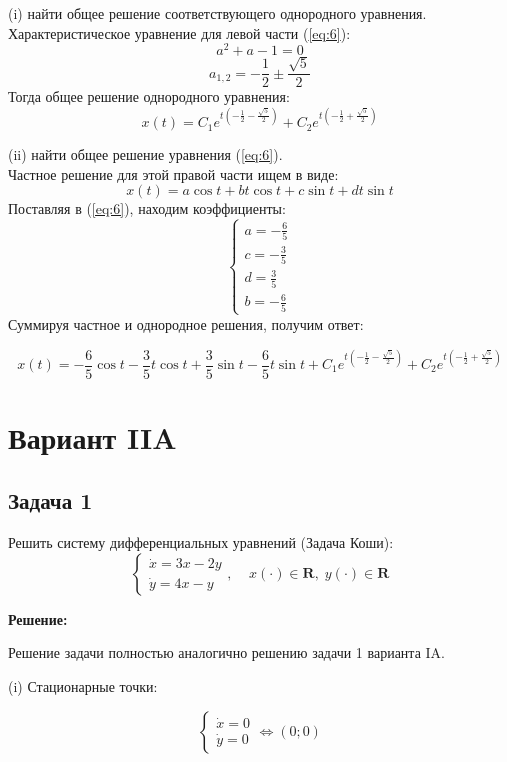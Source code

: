 \documentclass[a4paper, 12pt]{article}
\begin{document}
(i) найти общее решение соответствующего однородного уравнения.\\
Характеристическое уравнение для левой части (\ref{eq:6}):
\[a^2+a-1=0\]
\[a_{1,2}=-\frac 1 2 \pm \frac {\sqrt{5}}{2}\]
Тогда общее решение однородного уравнения:
\begin{equation}
x(t) = C_1e^{t\left(-\frac 1 2 - \frac {\sqrt{5}}{2}\right)}+C_2e^{t\left(-\frac 1 2 + \frac {\sqrt{5}}{2}\right)}
\label{eq:7}
\end{equation}

(ii) найти общее решение уравнения (\ref{eq:6}).\\
Частное решение для этой правой части ищем в виде:
\[ x(t) = a\cos{t}+bt\cos{t}+c\sin{t}+dt\sin{t}\]
Поставляя в (\ref{eq:6}), находим коэффициенты: 
\[
\left\{
\begin{array}{lr}
a = -\frac 6 5 \\
c = - \frac 3 5 \\
d =  \frac 3 5 \\
b=- \frac 6 5 
\end{array}
\right.
\]
Суммируя частное и однородное решения, получим ответ:

\[x(t) = -\frac 6 5\cos{t} - \frac 3 5 t \cos{t} + \frac 3 5 \sin{t} - \frac 6 5 t\sin{t} + C_1e^{t\left(-\frac 1 2 - \frac {\sqrt{5}}{2}\right)}+C_2e^{t\left(-\frac 1 2 + \frac {\sqrt{5}}{2}\right)} \]



	\section{Вариант IIA}
		\subsection {Задача 1}
 Решить систему дифференциальных уравнений (Задача Коши): 
\begin{equation}
\left\{
\begin{array}{lr}
\dot{x} = 3x-2y\\
\dot{y} = 4x-y
\end{array}
\right.
, \;\;\;\; x(\cdot)\in \textbf{R},\; y(\cdot)\in \textbf{R}
\label{eq:7}
\end{equation}

\textbf{Решение:} \par
Решение задачи полностью аналогично решению задачи 1 варианта IA.  

(i) Стационарные точки:

\[
\left\{
\begin{array}{lr}
\dot{x} = 0\\
\dot{y} = 0
\end{array}
\right.
\Leftrightarrow (0;0)
\]
\end{document}
